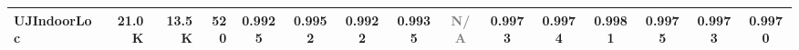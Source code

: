 \begin{table}[t]
{\begin{tabular}{lrrrccccccccccc}
UJIndoorLoc & 21.0K & 13.5K & 520 & \cellcolor[HTML]{F5D0CC}0.9925 & \cellcolor[HTML]{FEF2CC}0.9952 & \cellcolor[HTML]{F4CCCC}0.9922 & \cellcolor[HTML]{F9DDCC}0.9935 & \textcolor{gray}{N/A} & \cellcolor[HTML]{E3ECD1}0.9973 & \cellcolor[HTML]{E2ECD1}0.9974 & \cellcolor[HTML]{D9EAD3}\textbf{0.9981} & \cellcolor[HTML]{E1ECD2}0.9975 & \cellcolor[HTML]{E3ECD1}0.9973 & \cellcolor[HTML]{E7EDD0}0.9970 \\
\bottomrule
\end{tabular}%
}
\vspace{2pt}
\begin{minipage}{0.99\textwidth}
\end{minipage}
\end{table}